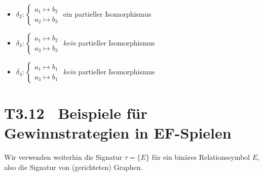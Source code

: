 \documentclass[fontsize=11pt, twoside=false, numbers=autoenddot]{scrbook}
\begin{document}
\begin{itemize}
%
    \par\smallskip
  \item
    $\delta_2 : \begin{cases}
                  a_1 \mapsto b_2 \\
                  a_2 \mapsto b_3
                \end{cases}$
    \quad ein partieller Isomorphismus
    \par\smallskip
  \item
    $\delta_3 : \begin{cases}
                  a_1 \mapsto b_2 \\
                  a_3 \mapsto b_3
                \end{cases}$
    \quad \emph{kein} partieller Isomorphismus
    \par\smallskip
  \item
    $\delta_4 : \begin{cases}
                  a_1 \mapsto b_1 \\
                  a_3 \mapsto b_1
                \end{cases}$
    \quad \emph{kein} partieller Isomorphismus
\end{itemize}

\section*{T3.12~ Beispiele für Gewinnstrategien in EF-Spielen}

Wir verwenden weiterhin die Signatur $\tau = \{E\}$ für ein binäres Relationssymbol $E$,
also die Signatur von (gerichteten) Graphen.
\end{document}
